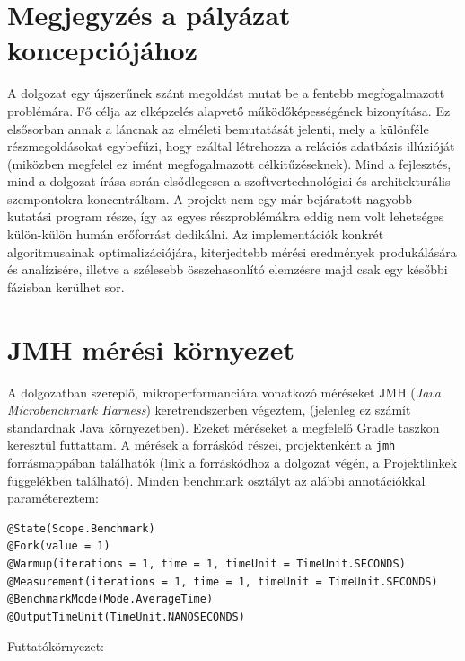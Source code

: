 \documentclass[
    parspace,
    noindent,
    nohyp,
]{elteiktdk}[2023/04/10]
\begin{document}
\section{Megjegyzés a pályázat koncepciójához}

A dolgozat egy újszerűnek szánt megoldást mutat be a fentebb megfogalmazott problémára.
Fő célja az elképzelés alapvető működőképességének bizonyítása.
Ez elsősorban annak a láncnak az elméleti bemutatását jelenti,
mely a különféle részmegoldásokat egybefűzi,
hogy ezáltal létrehozza a relációs adatbázis illúzióját
(miközben megfelel ez imént megfogalmazott célkitűzéseknek).
Mind a fejlesztés, mind a dolgozat írása során elsődlegesen
a szoftvertechnológiai és architekturális szempontokra koncentráltam.
A projekt nem egy már bejáratott nagyobb kutatási program része,
így az egyes részproblémákra eddig nem volt lehetséges külön-külön humán erőforrást dedikálni.
Az implementációk konkrét algoritmusainak optimalizációjára,
kiterjedtebb mérési eredmények produkálására és analízisére,
illetve a szélesebb összehasonlító elemzésre
majd csak egy későbbi fázisban kerülhet sor.

\section{JMH mérési környezet}
\label{jmhBenchmarkEnvironment}

A dolgozatban szereplő, mikroperformanciára vonatkozó méréseket JMH (\textit{Java Microbenchmark Harness}) keretrendszerben végeztem,
(jelenleg ez számít standardnak Java környezetben).
Ezeket méréseket a megfelelő Gradle taszkon keresztül futtattam.
A mérések a forráskód részei, projektenként a \texttt{jmh} forrásmappában találhatók
(link a forráskódhoz a dolgozat végén, a \hyperref[appendix:projectlinks]{Projektlinkek függelékben} található).
Minden benchmark osztályt az alábbi annotációkkal paramétereztem:

\vspace{-5pt}
\begin{verbatim}
@State(Scope.Benchmark)
@Fork(value = 1)
@Warmup(iterations = 1, time = 1, timeUnit = TimeUnit.SECONDS)
@Measurement(iterations = 1, time = 1, timeUnit = TimeUnit.SECONDS)
@BenchmarkMode(Mode.AverageTime)
@OutputTimeUnit(TimeUnit.NANOSECONDS)
\end{verbatim}
\vspace{-35pt}

Futtatókörnyezet:
\end{document}
